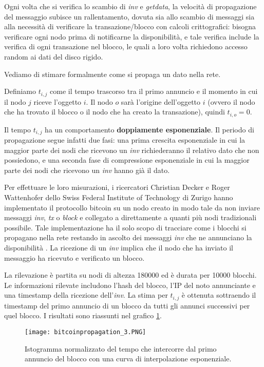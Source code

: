 Ogni volta che si verifica lo scambio di \emph{inv} e \emph{getdata}, la velocità di propagazione del messaggio subisce un rallentamento, dovuta sia allo scambio di messaggi sia alla necessità di verificare la transazione/blocco con calcoli crittografici: bisogna verificare ogni nodo prima di notificarne la disponibilità, e tale verifica include la verifica di ogni transazione nel blocco, le quali a loro volta richiedono accesso random ai dati del disco rigido.

Vediamo di stimare formalmente come si propaga un dato nella rete.

Definiamo $t_{i,j}$ come il tempo trascorso tra il primo annuncio e il momento in cui il nodo $j$ riceve l'oggetto $i$. Il nodo $o$ sarà l'origine dell'oggetto $i$ (ovvero il nodo che ha trovato il blocco o il nodo che ha creato la transazione), quindi $t_{i,o}=0$.

Il tempo $t_{i,j}$ ha un comportamento \textbf{doppiamente esponenziale}. Il periodo di propagazione segue infatti due fasi: una prima crescita esponenziale in cui la maggior parte dei nodi che ricevono un \emph{inv} richiederanno il relativo dato che non possiedono, e una seconda fase di compressione esponenziale in cui la maggior parte dei nodi che ricevono un \emph{inv} hanno già il dato.

Per effettuare le loro misurazioni, i ricercatori Christian Decker e Roger Wattenhofer dello Swiss Federal Institute of Technology di Zurigo hanno implementato il protocollo bitcoin su un nodo creato in modo tale da non inviare messaggi \emph{inv}, \emph{tx} o \emph{block} e collegato a direttamente a quanti più nodi tradizionali possibile. Tale implementazione ha il solo scopo di tracciare come i blocchi si propagano nella rete restando in ascolto dei messaggi \emph{inv} che ne annunciano la disponibilità \cite{bitcoinpropagation}. La ricezione di un \emph{inv} implica che il nodo che ha inviato il messaggio ha ricevuto e verificato un blocco.

La rilevazione è partita su nodi di altezza 180000 ed è durata per 10000 blocchi. Le informazioni rilevate includono l'hash del blocco, l'IP del noto annunciante e una timestamp della ricezione dell'\emph{inv}. La stima per $t_{i,j}$ è ottenuta sottraendo il timestamp del primo annuncio di un blocco da tutti gli annunci successivi per quel blocco. I risultati sono riassunti nel grafico \ref{bitcoinpropagation_3}.

\begin{figure}[htbp]
\centering
\texttt{[image: bitcoinpropagation\_3.PNG]}
\caption{Istogramma normalizzato del tempo che intercorre dal primo annuncio del blocco con una curva di interpolazione esponenziale.\label{bitcoinpropagation_3}}
\end{figure}

